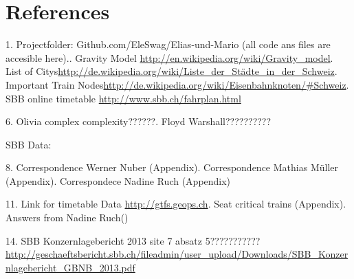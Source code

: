 \documentclass[11pt]{article}
\begin{document}
\section{References}
1. Projectfolder: Github.com/EleSwag/Elias-und-Mario (all code ans files are accesible here).. Gravity Model \url{http://en.wikipedia.org/wiki/Gravity_model}. List of Citys\url{http://de.wikipedia.org/wiki/Liste_der_Städte_in_der_Schweiz}. Important Train Nodes\url{http://de.wikipedia.org/wiki/Eisenbahnknoten/\#Schweiz}. SBB online timetable \url{http://www.sbb.ch/fahrplan.html}\newline

6. Olivia complex complexity??????. Floyd Warshall??????????\newline

SBB Data:

8. Correspondence Werner Nuber (Appendix). Correspondence Mathias Müller (Appendix). Correspondece Nadine Ruch (Appendix)\newline

11. Link for timetable Data \url{http://gtfs.geops.ch}. Seat critical trains (Appendix). Answers from Nadine Ruch()\newline

14. SBB Konzernlagebericht 2013 site 7 absatz 5???????????\url{http://geschaeftsbericht.sbb.ch/fileadmin/user_upload/Downloads/SBB_Konzernlagebericht_GBNB_2013.pdf}\newline

\appendix
\end{document}
